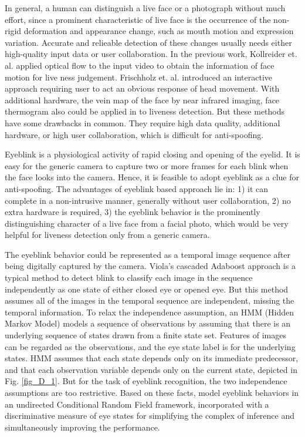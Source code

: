 \documentclass[journal]{IEEEtran}
\begin{document}
In general, a human can distinguish a live face or a photograph without much effort, since a prominent characteristic of live face is the occurrence of the non-rigid deformation and appearance change, such as mouth motion and expression variation. Accurate and relieable detection of these changes usually needs either high-quality input data or user collaboration. In the previous work, Kollreider et. al. \cite{kollreider2005evaluating} applied optical flow to the input video to obtain the information of face motion for live ness judgement. Frischholz et. al. \cite{frischholz2003avoiding} introduced an interactive approach requiring user to act an obvious response of head movement. With additional hardware, the vein map of the face by near infrared imaging, face thermogram \cite{socolinsky2003face} also could be applied in to liveness detection. But these methods have some drawbacks in common. They require high data quality, additional hardware, or high user collaboration, which is difficult for anti-spoofing.

Eyeblink is a physiological activity of rapid closing and opening of the eyelid. It is easy for the generic camera to capture two or more frames for each blink when the face looks into the camera. Hence, it is feasible to adopt eyeblink as a clue for anti-spoofing. The advantages of eyeblink based approach lie in: 1) it can complete in a non-intrusive manner, generally without user collaboration, 2) no extra hardware is required, 3) the eyeblink behavior is the prominently distinguishing character of a live face from a facial photo, which would be very helpful for liveness detection only from a generic camera.

The eyeblink behavior could be represented as a temporal image sequence after being digitally captured by the camera. Viola's cascaded Adaboost approach \cite{viola2001rapid} is a typical method to detect blink to classify each image in the sequence independently as one state of either closed eye or opened eye. But this method assumes all of the images in the temporal sequence are independent, missing the temporal information. To relax the independence assumption, an HMM (Hidden Markov Model) \cite{rabiner1989tutorial} models a sequence of observations by assuming that there is an underlying sequence of states drawn from a finite state set. Features of images can be regarded as the observations, and the eye state label is for the underlying states. HMM assumes that each state depends only on its immediate predecessor, and that each observation variable depends only on the current state, depicted in Fig. \ref{fig_D_1}. But for the task of eyeblink recognition, the two independence assumptions are too restrictive. Based on these facts, \cite{pan2007eyeblink} model eyeblink behaviors in an undirected Conditional Random Field framework, incorporated with a discriminative measure of eye states for simplifying the complex of inference and simultaneously improving the performance.
\end{document}
